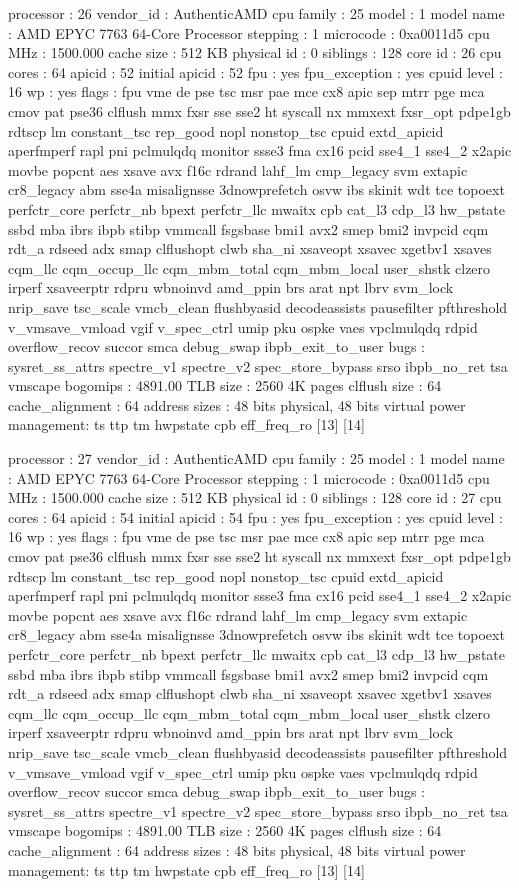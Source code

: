processor	: 26
vendor_id	: AuthenticAMD
cpu family	: 25
model		: 1
model name	: AMD EPYC 7763 64-Core Processor
stepping	: 1
microcode	: 0xa0011d5
cpu MHz		: 1500.000
cache size	: 512 KB
physical id	: 0
siblings	: 128
core id		: 26
cpu cores	: 64
apicid		: 52
initial apicid	: 52
fpu		: yes
fpu_exception	: yes
cpuid level	: 16
wp		: yes
flags		: fpu vme de pse tsc msr pae mce cx8 apic sep mtrr pge mca cmov pat pse36 clflush mmx fxsr sse sse2 ht syscall nx mmxext fxsr_opt pdpe1gb rdtscp lm constant_tsc rep_good nopl nonstop_tsc cpuid extd_apicid aperfmperf rapl pni pclmulqdq monitor ssse3 fma cx16 pcid sse4_1 sse4_2 x2apic movbe popcnt aes xsave avx f16c rdrand lahf_lm cmp_legacy svm extapic cr8_legacy abm sse4a misalignsse 3dnowprefetch osvw ibs skinit wdt tce topoext perfctr_core perfctr_nb bpext perfctr_llc mwaitx cpb cat_l3 cdp_l3 hw_pstate ssbd mba ibrs ibpb stibp vmmcall fsgsbase bmi1 avx2 smep bmi2 invpcid cqm rdt_a rdseed adx smap clflushopt clwb sha_ni xsaveopt xsavec xgetbv1 xsaves cqm_llc cqm_occup_llc cqm_mbm_total cqm_mbm_local user_shstk clzero irperf xsaveerptr rdpru wbnoinvd amd_ppin brs arat npt lbrv svm_lock nrip_save tsc_scale vmcb_clean flushbyasid decodeassists pausefilter pfthreshold v_vmsave_vmload vgif v_spec_ctrl umip pku ospke vaes vpclmulqdq rdpid overflow_recov succor smca debug_swap ibpb_exit_to_user
bugs		: sysret_ss_attrs spectre_v1 spectre_v2 spec_store_bypass srso ibpb_no_ret tsa vmscape
bogomips	: 4891.00
TLB size	: 2560 4K pages
clflush size	: 64
cache_alignment	: 64
address sizes	: 48 bits physical, 48 bits virtual
power management: ts ttp tm hwpstate cpb eff_freq_ro [13] [14]

processor	: 27
vendor_id	: AuthenticAMD
cpu family	: 25
model		: 1
model name	: AMD EPYC 7763 64-Core Processor
stepping	: 1
microcode	: 0xa0011d5
cpu MHz		: 1500.000
cache size	: 512 KB
physical id	: 0
siblings	: 128
core id		: 27
cpu cores	: 64
apicid		: 54
initial apicid	: 54
fpu		: yes
fpu_exception	: yes
cpuid level	: 16
wp		: yes
flags		: fpu vme de pse tsc msr pae mce cx8 apic sep mtrr pge mca cmov pat pse36 clflush mmx fxsr sse sse2 ht syscall nx mmxext fxsr_opt pdpe1gb rdtscp lm constant_tsc rep_good nopl nonstop_tsc cpuid extd_apicid aperfmperf rapl pni pclmulqdq monitor ssse3 fma cx16 pcid sse4_1 sse4_2 x2apic movbe popcnt aes xsave avx f16c rdrand lahf_lm cmp_legacy svm extapic cr8_legacy abm sse4a misalignsse 3dnowprefetch osvw ibs skinit wdt tce topoext perfctr_core perfctr_nb bpext perfctr_llc mwaitx cpb cat_l3 cdp_l3 hw_pstate ssbd mba ibrs ibpb stibp vmmcall fsgsbase bmi1 avx2 smep bmi2 invpcid cqm rdt_a rdseed adx smap clflushopt clwb sha_ni xsaveopt xsavec xgetbv1 xsaves cqm_llc cqm_occup_llc cqm_mbm_total cqm_mbm_local user_shstk clzero irperf xsaveerptr rdpru wbnoinvd amd_ppin brs arat npt lbrv svm_lock nrip_save tsc_scale vmcb_clean flushbyasid decodeassists pausefilter pfthreshold v_vmsave_vmload vgif v_spec_ctrl umip pku ospke vaes vpclmulqdq rdpid overflow_recov succor smca debug_swap ibpb_exit_to_user
bugs		: sysret_ss_attrs spectre_v1 spectre_v2 spec_store_bypass srso ibpb_no_ret tsa vmscape
bogomips	: 4891.00
TLB size	: 2560 4K pages
clflush size	: 64
cache_alignment	: 64
address sizes	: 48 bits physical, 48 bits virtual
power management: ts ttp tm hwpstate cpb eff_freq_ro [13] [14]

